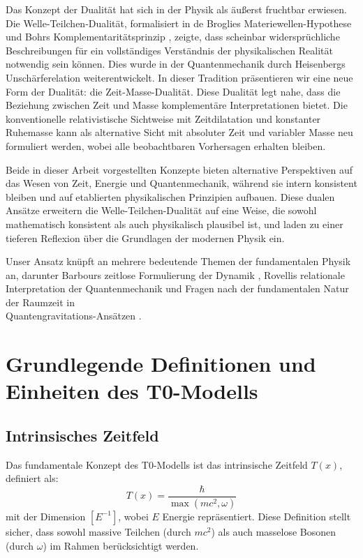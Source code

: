 \documentclass[a4paper,12pt]{article}
\newcommand{\Tfield}{T(x)}
\begin{document}
	Das Konzept der Dualität hat sich in der Physik als äußerst fruchtbar erwiesen. Die Welle-Teilchen-Dualität, formalisiert in de Broglies Materiewellen-Hypothese \cite{deBroglie1923} und Bohrs Komplementaritätsprinzip \cite{Bohr1928}, zeigte, dass scheinbar widersprüchliche Beschreibungen für ein vollständiges Verständnis der physikalischen Realität notwendig sein können. Dies wurde in der Quantenmechanik durch Heisenbergs Unschärferelation \cite{Heisenberg1927} weiterentwickelt. In dieser Tradition präsentieren wir eine neue Form der Dualität: die Zeit-Masse-Dualität. Diese Dualität legt nahe, dass die Beziehung zwischen Zeit und Masse komplementäre Interpretationen bietet. Die konventionelle relativistische Sichtweise mit Zeitdilatation und konstanter Ruhemasse kann als alternative Sicht mit absoluter Zeit und variabler Masse neu formuliert werden, wobei alle beobachtbaren Vorhersagen erhalten bleiben.
	
	Beide in dieser Arbeit vorgestellten Konzepte bieten alternative Perspektiven auf das Wesen von Zeit, Energie und Quantenmechanik, während sie intern konsistent bleiben und auf etablierten physikalischen Prinzipien aufbauen. Diese dualen Ansätze erweitern die Welle-Teilchen-Dualität auf eine Weise, die sowohl mathematisch konsistent als auch physikalisch plausibel ist, und laden zu einer tieferen Reflexion über die Grundlagen der modernen Physik ein.
	
	Unser Ansatz knüpft an mehrere bedeutende Themen der fundamentalen Physik an, darunter Barbours zeitlose Formulierung der Dynamik \cite{Barbour1994}, Rovellis relationale Interpretation der Quantenmechanik \cite{Rovelli1996} und Fragen nach der fundamentalen Natur der Raumzeit in \\Quantengravitations-Ansätzen \cite{Oriti2014}.
	
	\section{Grundlegende Definitionen und Einheiten des T0-Modells}
	
	\subsection{Intrinsisches Zeitfeld}
	Das fundamentale Konzept des T0-Modells ist das intrinsische Zeitfeld $\Tfield$, definiert als:
	\[
	\Tfield = \frac{\hbar}{\max(mc^2, \omega)}
	\]
	mit der Dimension $[E^{-1}]$, wobei $E$ Energie repräsentiert. Diese Definition stellt sicher, dass sowohl massive Teilchen (durch $mc^2$) als auch masselose Bosonen (durch $\omega$) im Rahmen berücksichtigt werden.
	
\end{document}
